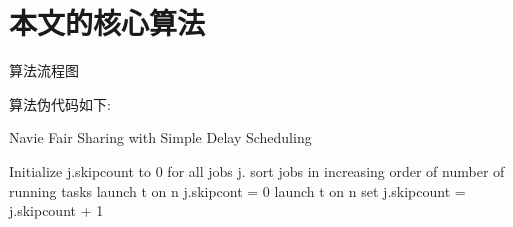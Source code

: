 \section{本文的核心算法}
算法流程图

算法伪代码如下:
\begin{algorithm}
\caption{Navie Fair Sharing with Simple Delay Scheduling }
\begin{algorithmic}
\State Initialize j.skipcount to 0 for all jobs j.
\State sort jobs in increasing order of number of running tasks
		\State launch t on n
		\State j.skipcont = 0
				\State launch t on n
				\Else
				\State set j.skipcount = j.skipcount + 1
				\EndIf
		\EndIf
	\EndFor
\EndIf
\end{algorithmic}

\end{algorithm}